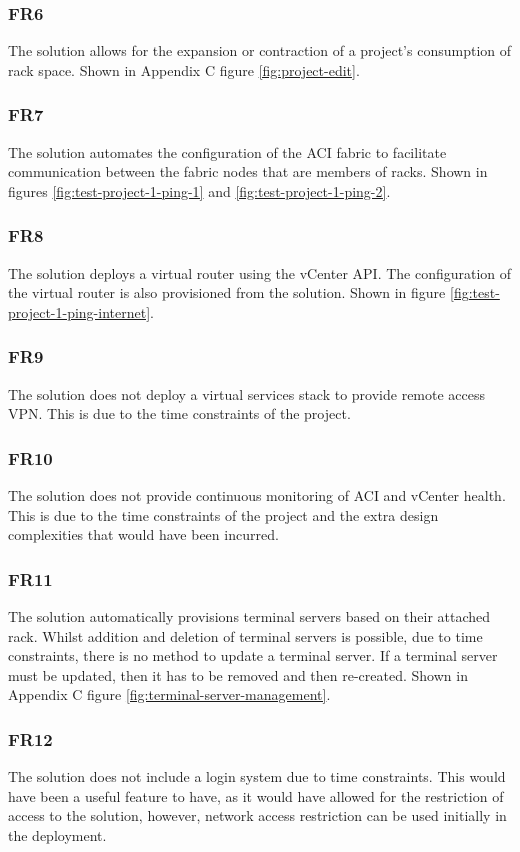 \subsubsection{FR6}
The solution allows for the expansion or contraction of a project's consumption of rack space. Shown in Appendix C figure \ref{fig:project-edit}.

\subsubsection{FR7}
The solution automates the configuration of the ACI fabric to facilitate communication between the fabric nodes that are members of racks. Shown in figures \ref{fig:test-project-1-ping-1} and \ref{fig:test-project-1-ping-2}.

\subsubsection{FR8}
The solution deploys a virtual router using the vCenter API. The configuration of the virtual router is also provisioned from the solution. Shown in figure \ref{fig:test-project-1-ping-internet}.

\subsubsection{FR9}
The solution does not deploy a virtual services stack to provide remote access VPN. This is due to the time constraints of the project.

\subsubsection{FR10}
The solution does not provide continuous monitoring of ACI and vCenter health. This is due to the time constraints of the project and the extra design complexities that would have been incurred.

\subsubsection{FR11}
The solution automatically provisions terminal servers based on their attached rack. Whilst addition and deletion of terminal servers is possible, due to time constraints, there is no method to update a terminal server. If a terminal server must be updated, then it has to be removed and then re-created. Shown in Appendix C figure \ref{fig:terminal-server-management}.

\subsubsection{FR12}
The solution does not include a login system due to time constraints. This would have been a useful feature to have, as it would have allowed for the restriction of access to the solution, however, network access restriction can be used initially in the deployment.

